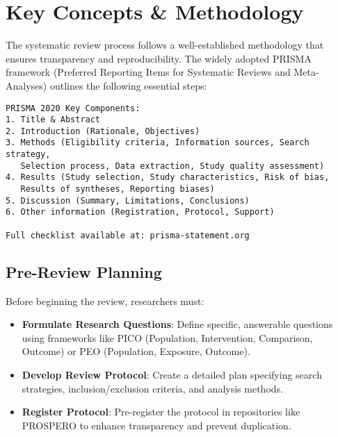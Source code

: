 \section{Key Concepts \& Methodology}

The systematic review process follows a well-established methodology that ensures transparency and reproducibility. The widely adopted PRISMA framework (Preferred Reporting Items for Systematic Reviews and Meta-Analyses) outlines the following essential steps:

\begin{infobox}
\begin{lstlisting}
PRISMA 2020 Key Components:
1. Title & Abstract
2. Introduction (Rationale, Objectives)
3. Methods (Eligibility criteria, Information sources, Search strategy,
   Selection process, Data extraction, Study quality assessment)
4. Results (Study selection, Study characteristics, Risk of bias,
   Results of syntheses, Reporting biases)
5. Discussion (Summary, Limitations, Conclusions)
6. Other information (Registration, Protocol, Support)

Full checklist available at: prisma-statement.org
\end{lstlisting}
\end{infobox}

\subsection{Pre-Review Planning}

Before beginning the review, researchers must:

\begin{itemize}
    \item \textbf{Formulate Research Questions}: Define specific, answerable questions using frameworks like PICO (Population, Intervention, Comparison, Outcome) or PEO (Population, Exposure, Outcome).
    \item \textbf{Develop Review Protocol}: Create a detailed plan specifying search strategies, inclusion/exclusion criteria, and analysis methods.

    \item \textbf{Register Protocol}: Pre-register the protocol in repositories like PROSPERO to enhance transparency and prevent duplication.
\end{itemize}

